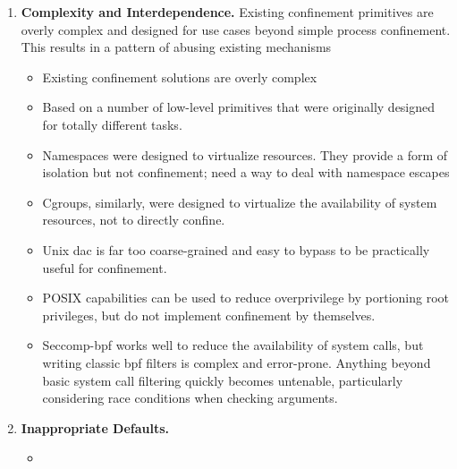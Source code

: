 \begin{enumerate}
  \item \textbf{Complexity and Interdependence.}
    Existing confinement primitives are overly complex and designed for use
    cases beyond simple process confinement. This results in a pattern of
    abusing existing mechanisms
  \begin{inprogress}
    \begin{itemize}
      \item Existing confinement solutions are overly complex
      \item Based on a number of low-level primitives that were originally designed for
            totally different tasks.
      \item Namespaces were designed to virtualize resources. They provide a form of
            isolation but not confinement; need a way to deal with namespace escapes
      \item Cgroups, similarly, were designed to virtualize the availability of system
            resources, not to directly confine.
      \item Unix \gls{dac} is far too coarse-grained and easy to bypass to be practically useful for confinement.
      \item POSIX capabilities can be used to reduce overprivilege by portioning root privileges, but do not
            implement confinement by themselves.
      \item Seccomp-bpf works well to reduce the availability of system calls, but writing
            classic \gls{bpf} filters is complex and error-prone. Anything beyond basic system call
            filtering quickly becomes untenable, particularly considering race conditions when
            checking arguments.
    \end{itemize}
  \end{inprogress}

  \item \textbf{Inappropriate Defaults.}
  \begin{inprogress}
    \begin{itemize}
      \item
    \end{itemize}
  \end{inprogress}


\end{enumerate}
